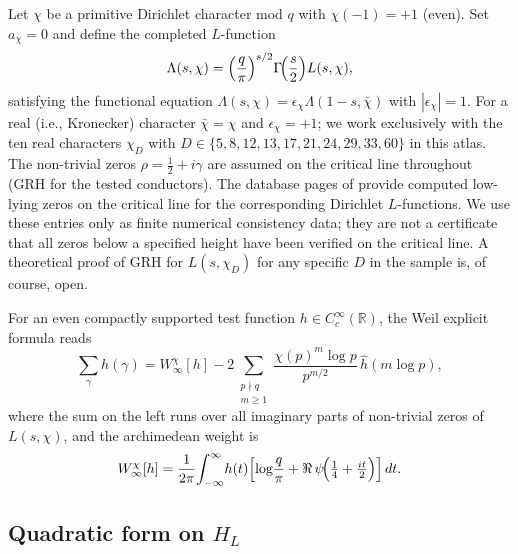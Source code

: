 \documentclass[a4paper,10pt,twocolumn]{article}
\theoremstyle{definition}
\theoremstyle{remark}
\newcommand{\chifn}{\chi}
\newcommand{\halfline}{\tfrac{1}{2}}
\begin{document}
Let $\chifn$ be a primitive Dirichlet character mod $q$ with
$\chifn(-1)=+1$ (even). Set $a_{\chifn}=0$ and define the completed
$L$-function
\[
  \Lambda(s,\chifn)
    =\Bigl(\frac{q}{\pi}\Bigr)^{s/2}\Gamma\!\Bigl(\frac{s}{2}\Bigr)
      L(s,\chifn),
\]
satisfying the functional equation
$\Lambda(s,\chifn)=\epsilon_{\chifn}\Lambda(1-s,\bar\chifn)$ with
$|\epsilon_{\chifn}|=1$. For a real (i.e., Kronecker) character
$\bar\chifn=\chifn$ and $\epsilon_{\chifn}=+1$; we work exclusively
with the ten real characters $\chifn_D$ with $D\in\{5,8,12,13,17,21,
24,29,33,60\}$ in this atlas. The non-trivial zeros
$\rho=\halfline+i\gamma$ are assumed on the critical line throughout
(GRH for the tested conductors). The database pages of \cite{LMFDB}
provide computed low-lying zeros on the critical line for the
corresponding Dirichlet $L$-functions. We use these entries only as
finite numerical consistency data; they are not a certificate that all
zeros below a specified height have been verified on the critical line.
A theoretical proof of GRH for $L(s,\chifn_D)$ for any specific $D$ in
the sample is, of course, open.

For an even compactly supported test function $h\in C_c^\infty
(\mathbb{R})$, the Weil explicit formula
\cite{Weil1952,IwaniecKowalski} reads
\begin{equation}
\label{eq:weil}
  \sum_{\gamma}h(\gamma)
    = W^{\chifn}_\infty[h]
    - 2\sum_{\substack{p\nmid q\\m\geq 1}}
      \frac{\chifn(p)^m\log p}{p^{m/2}}\,\hat h(m\log p),
\end{equation}
where the sum on the left runs over all imaginary parts of non-trivial
zeros of $L(s,\chifn)$, and the archimedean weight is
\[
  W^{\chifn}_\infty[h]
    = \frac{1}{2\pi}\!\int_{-\infty}^{\infty}\! h(t)
      \Bigl[\log\!\frac{q}{\pi} + \Re\,\psi\!\Bigl(\tfrac14+\tfrac{it}{2}\Bigr)\Bigr]\,dt.
\]

\subsection{\texorpdfstring{Quadratic form on $H_L$}{Quadratic form on HL}}
\end{document}
